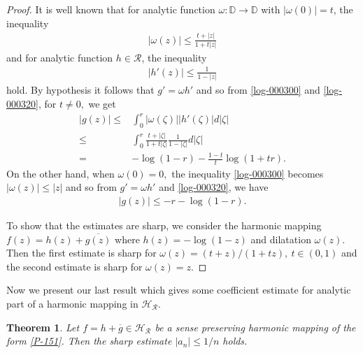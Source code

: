 \documentclass[a4paper,12pt]{amsart}
\newtheorem{thm}{Theorem}[section]
\theoremstyle{definition}
\newcounter {own}
\begin{document}
	\begin{proof}
	It is well known that for analytic function $\omega:\mathbb{D}\rightarrow\mathbb{D}$ with $|\omega(0)|=t$, the inequality
	\begin{align}|\label{log-000300}
		\omega(z)|\le \frac{t+|z|}{1+t|z|}
	\end{align}	
	and for analytic function $h\in\mathcal{R}$, the inequality
	\begin{align}\label{log-000320}
		|h'(z)|\le \frac{1}{1-|z|}
	\end{align}	
	hold. By hypothesis it follows that $g'=\omega h'$ and so from \eqref{log-000300} and \eqref{log-000320}, for $t\ne0,$ we get
	\begin{align*}
		|g(z)|\le & \int_{0}^{r}|\omega(\zeta)||h'(\zeta)|d|\zeta|\\
		       \le & \int_{0}^{r}\frac{t+|\zeta|}{1+t|\zeta|}\frac{1}{1-|\zeta|}d|\zeta|\\
		       = & -\log{(1-r)}-\frac{1-t}{t}\log{(1+tr)}.
	\end{align*}
	On the other hand, when $\omega(0)=0,$ the inequality \eqref{log-000300} becomes $|\omega(z)|\le |z|$ and so from $g'=\omega h'$ and \eqref{log-000320}, we have
		\begin{align*}
			|g(z)|\le -r-\log{(1-r)}.
		\end{align*}
	
		To show that the estimates are sharp, we consider the harmonic mapping $f(z)=h(z)+\overline{g(z)}$ where $h(z)=-\log{(1-z)}$ and dilatation $\omega(z).$ Then the first estimate is sharp for $\omega(z)=(t+z)/(1+t z),~t\in(0,1)$ and the second estimate is sharp for $\omega(z)=z.$
	\end{proof}
	
Now we present our last result which gives some coefficient estimate for analytic part of a harmonic mapping in $\mathcal{H_R}$.	
	
	\begin{thm}
		Let $f=h+\overline{g}\in\mathcal{H_R}$ be a sense preserving harmonic mapping of the form \eqref{P-151}. Then the sharp estimate $|a_n|\le 1/n$ holds. 
	\end{thm}
	
\end{document}
